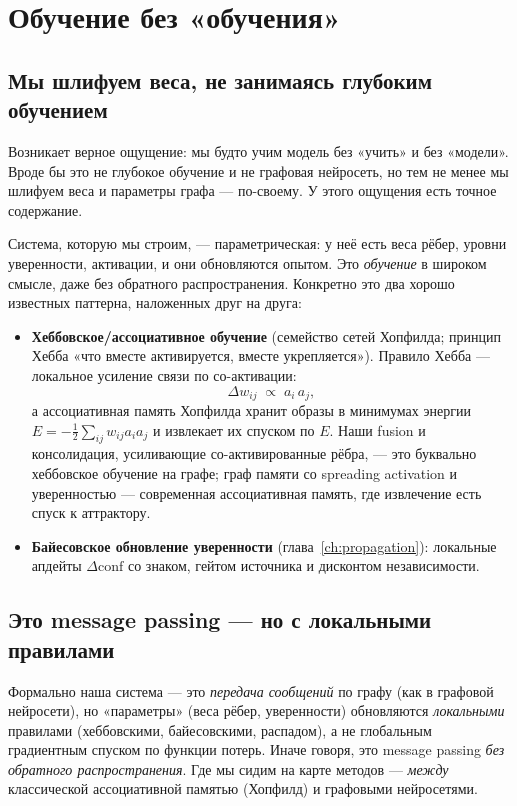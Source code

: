 \chapter{Обучение без «обучения»}
\label{ch:learning}

\section{Мы шлифуем веса, не занимаясь глубоким обучением}

Возникает верное ощущение: мы будто учим модель без «учить» и без «модели». Вроде
бы это не глубокое обучение и не графовая нейросеть, но тем не менее мы шлифуем
веса и параметры графа — по-своему. У этого ощущения есть точное содержание.

Система, которую мы строим, — параметрическая: у неё есть веса рёбер, уровни
уверенности, активации, и они обновляются опытом. Это \emph{обучение} в широком
смысле, даже без обратного распространения. Конкретно это два хорошо известных
паттерна, наложенных друг на друга:

\begin{itemize}
\item \textbf{Хеббовское/ассоциативное обучение} (семейство сетей Хопфилда;
принцип Хебба «что вместе активируется, вместе укрепляется»). Правило Хебба —
локальное усиление связи по со-активации:
\[
\Delta w_{ij}\;\propto\;a_i\,a_j ,
\]
а ассоциативная память Хопфилда хранит образы в минимумах энергии
$E=-\tfrac12\sum_{ij}w_{ij}a_i a_j$ и извлекает их спуском по $E$. Наши fusion и
консолидация, усиливающие со-активированные рёбра, — это буквально хеббовское
обучение на графе; граф памяти со spreading activation и уверенностью — современная
ассоциативная память, где извлечение есть спуск к аттрактору.
\item \textbf{Байесовское обновление уверенности} (глава~\ref{ch:propagation}):
локальные апдейты $\Delta\text{conf}$ со знаком, гейтом источника и дисконтом
независимости.
\end{itemize}

\section{Это message passing — но с локальными правилами}

Формально наша система — это \emph{передача сообщений} по графу (как в графовой
нейросети), но «параметры» (веса рёбер, уверенности) обновляются \emph{локальными}
правилами (хеббовскими, байесовскими, распадом), а не глобальным градиентным
спуском по функции потерь. Иначе говоря, это message passing \emph{без обратного
распространения}. Где мы сидим на карте методов — \emph{между} классической
ассоциативной памятью (Хопфилд) и графовыми нейросетями.

